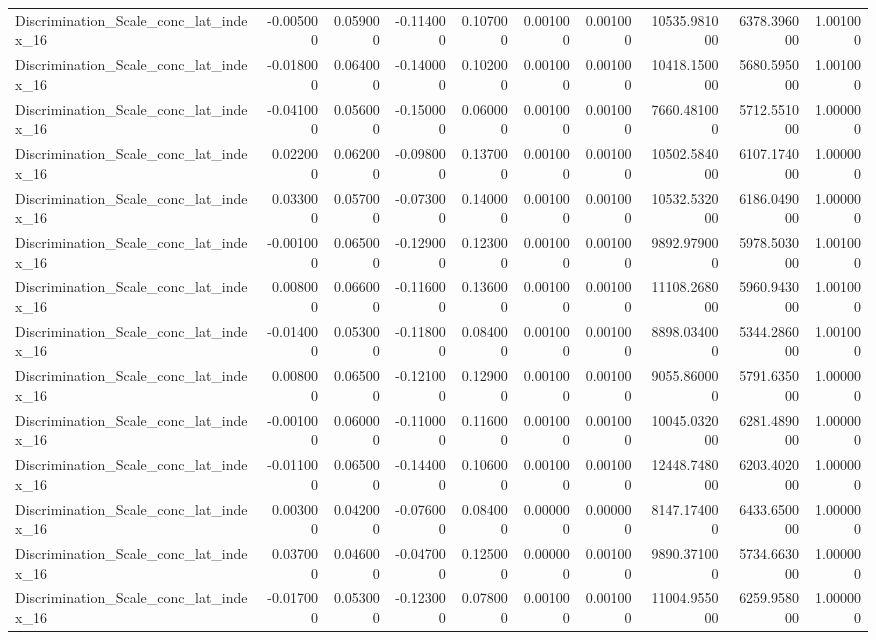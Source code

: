 \begin{table}
\begin{tabular}{lrrrrrrrrr}
Discrimination_Scale_conc_lat_index_16 & -0.005000 & 0.059000 & -0.114000 & 0.107000 & 0.001000 & 0.001000 & 10535.981000 & 6378.396000 & 1.001000 \\
Discrimination_Scale_conc_lat_index_16 & -0.018000 & 0.064000 & -0.140000 & 0.102000 & 0.001000 & 0.001000 & 10418.150000 & 5680.595000 & 1.001000 \\
Discrimination_Scale_conc_lat_index_16 & -0.041000 & 0.056000 & -0.150000 & 0.060000 & 0.001000 & 0.001000 & 7660.481000 & 5712.551000 & 1.000000 \\
Discrimination_Scale_conc_lat_index_16 & 0.022000 & 0.062000 & -0.098000 & 0.137000 & 0.001000 & 0.001000 & 10502.584000 & 6107.174000 & 1.000000 \\
Discrimination_Scale_conc_lat_index_16 & 0.033000 & 0.057000 & -0.073000 & 0.140000 & 0.001000 & 0.001000 & 10532.532000 & 6186.049000 & 1.000000 \\
Discrimination_Scale_conc_lat_index_16 & -0.001000 & 0.065000 & -0.129000 & 0.123000 & 0.001000 & 0.001000 & 9892.979000 & 5978.503000 & 1.001000 \\
Discrimination_Scale_conc_lat_index_16 & 0.008000 & 0.066000 & -0.116000 & 0.136000 & 0.001000 & 0.001000 & 11108.268000 & 5960.943000 & 1.001000 \\
Discrimination_Scale_conc_lat_index_16 & -0.014000 & 0.053000 & -0.118000 & 0.084000 & 0.001000 & 0.001000 & 8898.034000 & 5344.286000 & 1.001000 \\
Discrimination_Scale_conc_lat_index_16 & 0.008000 & 0.065000 & -0.121000 & 0.129000 & 0.001000 & 0.001000 & 9055.860000 & 5791.635000 & 1.000000 \\
Discrimination_Scale_conc_lat_index_16 & -0.001000 & 0.060000 & -0.110000 & 0.116000 & 0.001000 & 0.001000 & 10045.032000 & 6281.489000 & 1.000000 \\
Discrimination_Scale_conc_lat_index_16 & -0.011000 & 0.065000 & -0.144000 & 0.106000 & 0.001000 & 0.001000 & 12448.748000 & 6203.402000 & 1.000000 \\
Discrimination_Scale_conc_lat_index_16 & 0.003000 & 0.042000 & -0.076000 & 0.084000 & 0.000000 & 0.000000 & 8147.174000 & 6433.650000 & 1.000000 \\
Discrimination_Scale_conc_lat_index_16 & 0.037000 & 0.046000 & -0.047000 & 0.125000 & 0.000000 & 0.001000 & 9890.371000 & 5734.663000 & 1.000000 \\
Discrimination_Scale_conc_lat_index_16 & -0.017000 & 0.053000 & -0.123000 & 0.078000 & 0.001000 & 0.001000 & 11004.955000 & 6259.958000 & 1.000000 \\

\end{tabular}
\end{table}
